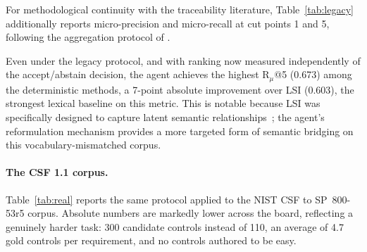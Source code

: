 \documentclass[a4paper,fleqn]{cas-sc}
\begin{document}
For methodological continuity with the traceability literature, Table~\ref{tab:legacy} additionally reports micro-precision and micro-recall at cut points 1 and 5, following the aggregation protocol of \citet{MarcusMaletic2003}.

\begin{table}[htbp]
\caption{Legacy micro-precision/recall at cut points on the diagnostic benchmark. Repeated-holdout protocol, 30 seeds; descriptive.}
\label{tab:legacy}
\centering
\setlength{\tabcolsep}{3pt}
\small
{}
\end{table}

Even under the legacy protocol, and with ranking now measured independently of the accept/abstain decision, the agent achieves the highest $\text{R}_\mu$@5 (0.673) among the deterministic methods, a 7-point absolute improvement over LSI (0.603), the strongest lexical baseline on this metric.
This is notable because LSI was specifically designed to capture latent semantic relationships~\citep{MarcusMaletic2003}; the agent's reformulation mechanism provides a more targeted form of semantic bridging on this vocabulary-mismatched corpus.


\paragraph{The CSF 1.1 corpus.}
\label{sec:results-real}

Table~\ref{tab:real} reports the same protocol applied to the NIST CSF to SP~800-53r5 corpus.
Absolute numbers are markedly lower across the board, reflecting a genuinely harder task: 300 candidate controls instead of 110, an average of 4.7 gold controls per requirement, and no controls authored to be easy.
\end{document}
